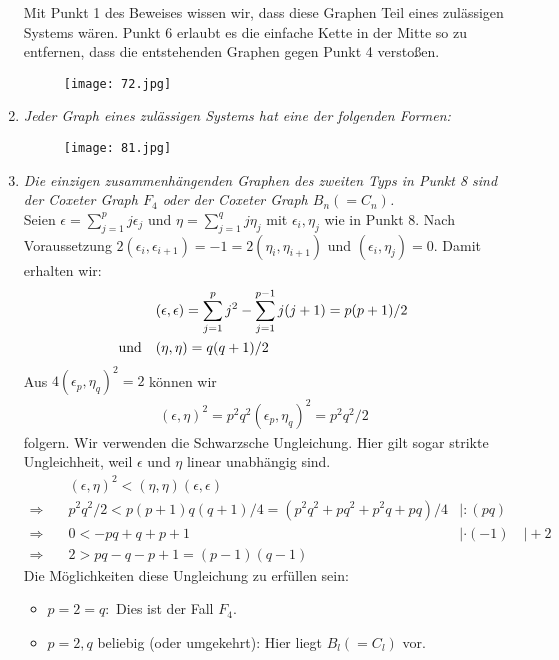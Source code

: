 \documentclass[a4paper,12pt]{article}
\begin{document}
\begin{enumerate}
Mit Punkt 1 des Beweises wissen wir, dass diese Graphen Teil eines zulässigen Systems wären. Punkt 6 erlaubt es die einfache Kette in der Mitte so zu entfernen, dass die entstehenden Graphen gegen Punkt 4 verstoßen.
\begin{figure}[H]
\centering
\texttt{[image: 72.jpg]}
\end{figure}


\item \emph{Jeder Graph eines zulässigen Systems hat eine der folgenden Formen:}
\begin{figure}[H]
\centering
\texttt{[image: 81.jpg]}
\end{figure}


\item \emph{Die einzigen zusammenhängenden Graphen des zweiten Typs in Punkt 8 sind der Coxeter Graph $F_4$ oder der Coxeter Graph $B_n (= C_n)$.}\\
Seien $\epsilon = \sum_{j=1}^p j\epsilon_j $ und $\eta = \sum_{j=1}^q j\eta_j$ mit $\epsilon_i, \eta_j$ wie in Punkt 8. Nach Voraussetzung $2(\epsilon_i, \epsilon_{i+1}) = -1 = 2(\eta_i, \eta_{i+1})$ und $(\epsilon_i, \eta_j) = 0$. Damit erhalten wir:
\begin{align}
&(\epsilon,\epsilon) = \sum_{j=1}^p j^2 - \sum_{j=1}^{p-1} j(j+1) = p(p+1)/2 \label{summationeps} \\
\text{und}\quad & (\eta,\eta) = q(q+1)/2\notag
\end{align}
Aus $4(\epsilon_p,\eta_q)^2 = 2$ können wir 
\begin{align*}
(\epsilon,\eta)^2 = p^2 q^2 (\epsilon_p, \eta_q)^2 = p^2 q^2 / 2
\end{align*}
folgern. Wir verwenden die Schwarzsche Ungleichung. Hier gilt sogar strikte Ungleichheit, weil $\epsilon$ und $\eta$ linear unabhängig sind. 
\begin{align*}
&(\epsilon,\eta)^2 < (\eta, \eta) (\epsilon,\epsilon)\\
\Rightarrow \quad& p^2q^2 / 2 < p(p+1)q(q+1)/4 =( p^2q^2 + pq^2 + p^2q+pq)/4 &|:(pq)\\
\Rightarrow \quad & 0<-pq+q+p+1& |\cdot (-1)\quad | +2\\
\Rightarrow \quad & 2>pq-q-p+1=(p-1)(q-1)
\end{align*}
Die Möglichkeiten diese Ungleichung zu erfüllen sein:
\begin{itemize}
\item $p=2=q:$ Dies ist der Fall $F_4$.
\item $p=2, q$ beliebig (oder umgekehrt): Hier liegt $B_l (= C_l)$ vor. 
\end{itemize}


\end{enumerate}
\end{document}
